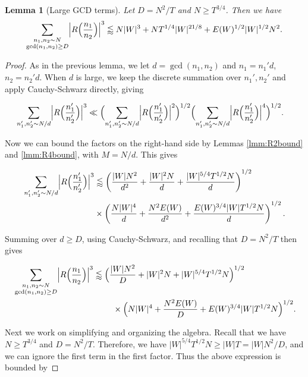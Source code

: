 \documentclass{amsart}
\theoremstyle{plain}
\newtheorem{lmm}[thrm]{Lemma}
\numberwithin{equation}{section}
\begin{document}
\begin{lmm}[Large GCD terms]\label{lmm:DBig}
Let $D=N^2/T$ and $N\ge T^{3/4}$. Then we have
\[
\sum_{\substack{n_1,n_2\sim N\\ \gcd(n_1,n_2)\ge D}}\Bigl|R\Bigl(\frac{n_1}{n_2}\Bigr)\Bigr|^3\lessapprox N|W|^3+NT^{1/4}|W|^{21/8}+E(W)^{1/2}|W|^{1/2}N^2.
\]
\end{lmm}
\begin{proof}
As in the previous lemma, we let $d=\gcd(n_1,n_2)$ and $n_1=n_1'd$, $n_2=n_2'd$. When $d$ is large, we keep the discrete summation over $n_1',n_2'$ and apply Cauchy-Schwarz directly, giving

\begin{align*}
\sum_{n_1',n_2'\sim N/d}\Bigl|R\Bigl(\frac{n_1'}{n_2'}\Bigr)\Bigr|^3 &\ll  \Bigl(\sum_{n_1',n_2'\sim N/d}\Bigr|R\Bigl(\frac{n_1'}{n_2'}\Bigr)\Bigl|^2\Bigr)^{1/2}\Bigl(\sum_{n_1',n_2'\sim N/d}\Bigl|R\Bigl(\frac{n_1'}{n_2'}\Bigr)\Bigr|^4\Bigr)^{1/2}.
\end{align*}

Now we can bound the factors on the right-hand side by Lemmas \ref{lmm:R2bound} and \ref{lmm:R4bound},  with $M= N/d$.   This gives

\begin{align*}
 \sum_{n_1',n_2'\sim N/d}\Bigl|R\Bigl(\frac{n_1'}{n_2'}\Bigr)\Bigr|^3&\lessapprox\left(   \frac{|W| N^2}{d^2} +\frac{|W|^2 N}{d}+\frac{|W|^{5/4}T^{1/2}N}{d}   \right)^{1/2} \\
&\times  \left( \frac{N|W|^4}{d}+\frac{N^2 E(W)}{d^2}+\frac{E(W)^{3/4}|W|T^{1/2}N}{d} \right)^{1/2}.
 \end{align*}

Summing over $d \ge D$, using Cauchy-Schwarz,  and recalling that $D = N^2/T$ then gives

\begin{align}
&\sum_{\substack{n_1,n_2\sim N\\ \gcd(n_1,n_2)\ge D}}\Bigl|R\Bigl(\frac{n_1}{n_2}\Bigr)\Bigr|^3 \lessapprox \Bigl(\frac{|W| N^2}{D}+|W|^2 N+|W|^{5/4}T^{1/2}N\Bigr)^{1/2}\nonumber\\
&\qquad\qquad\qquad\qquad\qquad\qquad \times\Bigl(N|W|^4+\frac{N^2 E(W)}{D}+E(W)^{3/4}|W|T^{1/2}N\Bigr)^{1/2}.\nonumber
\end{align}

Next we work on simplifying and organizing the algebra.  Recall that we have $N \ge T^{3/4}$ and $D=N^2/T$.   Therefore,  we have $|W|^{5/4} T^{1/2} N \ge |W| T=|W|N^2/D$,  and we can ignore the first term in the first factor. Thus the above expression is bounded by


\end{proof}
\end{document}
